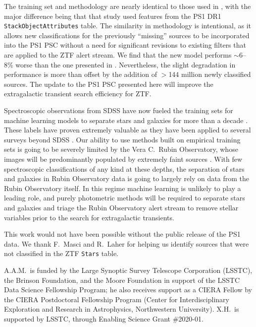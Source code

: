 \documentclass[twocolumn]{aastex63}
\begin{document}
The training set and methodology are nearly identical to those used in
\citet{Tachibana18}, with the major difference being that that study used
features from the PS1 DR1 \texttt{StackObjectAttributes} table. The similarity
in methodology is intentional, as it allows new classifications for the
previously ``missing'' sources to be incorporated into the PS1 PSC without a
need for significant revisions to existing filters that are applied to the ZTF
alert stream. We find that the new model performs $\sim$6--8\% worse than the
one presented in \citet[][see Table~\ref{tbl:thresh}]{Tachibana18}.
Nevertheless, the slight degradation in performance is more than offset by the
addition of $>$144 million newly classified sources. The update to the PS1 PSC
presented here will improve the extragalactic transient search efficiency for
ZTF.

Spectroscopic observations from SDSS have now fueled the training sets for
machine learning models to separate stars and galaxies for more than a decade
\citep[e.g.,][]{Ball06,Beck20}. These labels have proven extremely valuable as
they have been applied to several surveys beyond SDSS
\citep[e.g.,][]{Miller17,Beck20}. Our ability to use methods built on
empirical training sets is going to be severely limited by the Vera C.\ Rubin
Observatory, whose images will be predominantly populated by extremely faint
sources \citep[$r \approx 24$\,mag;][]{Ivezic19}. With few spectroscopic
classifications of any kind at these depths, the separation of stars and
galaxies in Rubin Observatory data is going to largely rely on data from the
Rubin Observatory itself. In this regime machine learning is unlikely to play
a leading role, and purely photometric methods will be required to separate
stars and galaxies \citep[e.g.,][]{Slater20} and triage the Rubin Observatory
alert stream to remove stellar variables prior to the search for extragalactic
transients.

\acknowledgments

This work would not have been possible without the public release of the PS1
data. We thank F.~Masci and R.~Laher for helping us identify sources that were
not classified in the ZTF \texttt{Stars} table.

A.A.M.~is funded by the Large Synoptic Survey Telescope Corporation (LSSTC),
the Brinson Foundation, and the Moore Foundation in support of the LSSTC Data
Science Fellowship Program; he also receives support as a CIERA Fellow by the
CIERA Postdoctoral Fellowship Program (Center for Interdisciplinary
Exploration and Research in Astrophysics, Northwestern University). X.H.~is
supported by LSSTC, through Enabling Science Grant \#2020-01.
\end{document}

